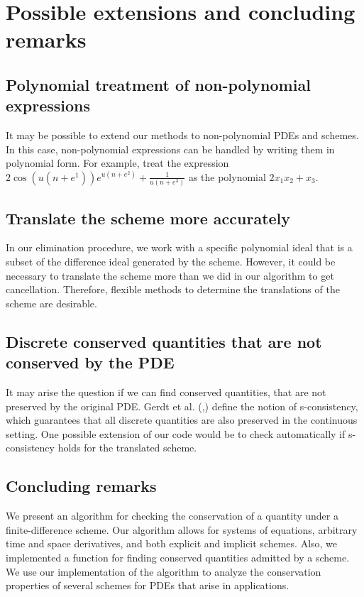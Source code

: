 \documentclass[sigconf,twocolumn]{acmart}
\newcommand{\1}{{\chi}}
\numberwithin{equation}{section}
\theoremstyle{thmlemcorr}
\numberwithin{theorem}{section}
\theoremstyle{thmlemcorr*}
\theoremstyle{defi}
\theoremstyle{remexample}
\theoremstyle{ass}
\begin{document}
\section{Possible extensions and concluding remarks}
\subsection*{Polynomial treatment of non-polynomial expressions}
It may be possible to extend our methods to non-polynomial PDEs and schemes. In this case, non-polynomial expressions can be handled by writing them in polynomial form. For example, treat the expression $2\cos(u(n+e^1))e^{u(n+e^2)}+\frac{1}{u(n+e^3)}$
as the polynomial $2x_1x_2+x_3$.
\subsection*{Translate the scheme more accurately}
In our elimination procedure, we work with a specific polynomial ideal that is a subset of the difference ideal generated by the scheme. However, it could be necessary to translate the scheme more than we did in our algorithm to get cancellation. Therefore, flexible methods to determine the translations of the scheme are desirable.
\subsection*{Discrete conserved quantities that are not conserved by the PDE}
It may arise the question if we can find conserved quantities, that are not preserved by the original PDE. Gerdt et al. (\cite{gerdt10},\cite{gerdt12}) define the notion of s-consistency, which guarantees that all discrete quantities are also preserved in the continuous setting. One possible extension of our code would be to check automatically if s-consistency holds for the translated scheme.
\subsection*{Concluding remarks}
We present an algorithm for checking the conservation of a quantity under a finite-difference scheme. Our algorithm allows for systems of equations, arbitrary time and space derivatives, and both explicit and implicit schemes. Also, we implemented a function for finding conserved quantities admitted by a scheme. We use our implementation of the algorithm to analyze the conservation properties of several schemes for PDEs that arise in applications.



\end{document}
